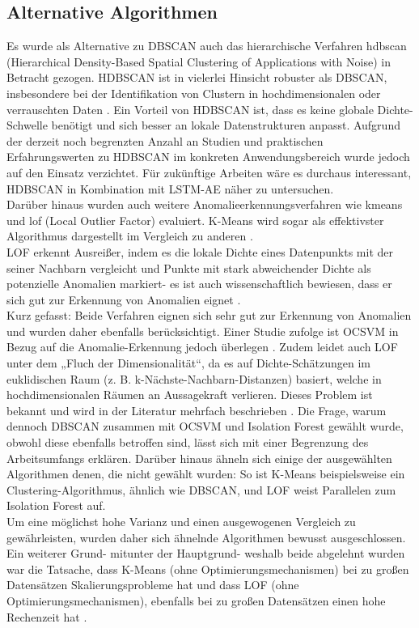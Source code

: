 \documentclass[a4paper,12pt]{article}
\begin{document}
	\subsection{Alternative Algorithmen}
	Es wurde als Alternative zu DBSCAN auch das hierarchische Verfahren \gls{hdbscan} (Hierarchical Density-Based Spatial Clustering of Applications with Noise) in Betracht gezogen. HDBSCAN ist in vielerlei Hinsicht robuster als DBSCAN,  insbesondere bei der Identifikation von Clustern in hochdimensionalen oder verrauschten Daten \cite{campello2015hierarchical}. Ein Vorteil von HDBSCAN ist, dass es keine globale Dichte-Schwelle benötigt und sich besser an lokale Datenstrukturen anpasst. Aufgrund der derzeit noch begrenzten Anzahl an Studien und praktischen Erfahrungswerten zu HDBSCAN im konkreten Anwendungsbereich wurde jedoch auf den Einsatz verzichtet. Für zukünftige Arbeiten wäre es durchaus interessant, HDBSCAN in Kombination mit LSTM-AE näher zu untersuchen.
	\\[0.5em]
	Darüber hinaus wurden auch weitere Anomalieerkennungsverfahren wie \gls{kmeans} und \gls{lof} (Local Outlier Factor) evaluiert. K-Means wird sogar als effektivster Algorithmus dargestellt im Vergleich zu anderen \cite{vinces2025comparative}.
	\\[0.5em]
	LOF erkennt Ausreißer, indem es die lokale Dichte eines Datenpunkts mit der seiner Nachbarn vergleicht und Punkte mit stark abweichender Dichte als potenzielle Anomalien markiert- es ist auch wissenschaftlich bewiesen, dass er sich gut zur Erkennung von Anomalien eignet \cite{breunig2000lof}.
	\\[0.5em]
	Kurz gefasst: Beide Verfahren eignen sich sehr gut zur Erkennung von Anomalien und wurden daher ebenfalls berücksichtigt. Einer Studie zufolge ist OCSVM in Bezug auf die Anomalie-Erkennung jedoch überlegen \cite{budiarto2025unsupervised}. Zudem leidet auch LOF unter dem „Fluch der Dimensionalität“, da es auf Dichte-Schätzungen im euklidischen Raum (z. B. k-Nächste-Nachbarn-Distanzen) basiert, welche in hochdimensionalen Räumen an Aussagekraft verlieren. Dieses Problem ist bekannt und wird in der Literatur mehrfach beschrieben \cite[S.366]{zimek2012survey}. Die Frage, warum dennoch DBSCAN zusammen mit OCSVM und Isolation Forest gewählt wurde, obwohl diese ebenfalls betroffen sind, lässt sich mit einer Begrenzung des Arbeitsumfangs erklären. Darüber hinaus ähneln sich einige der ausgewählten Algorithmen denen, die nicht gewählt wurden: So ist K-Means beispielsweise ein Clustering-Algorithmus, ähnlich wie DBSCAN, und LOF weist Parallelen zum Isolation Forest auf. 
	\\[0.5em]
	Um eine möglichst hohe Varianz und einen ausgewogenen Vergleich zu gewährleisten, wurden daher sich ähnelnde Algorithmen bewusst ausgeschlossen.
	Ein weiterer Grund- mitunter der Hauptgrund- weshalb beide abgelehnt wurden war die Tatsache, dass K-Means (ohne Optimierungsmechanismen) bei zu großen Datensätzen Skalierungsprobleme hat und dass LOF (ohne Optimierungsmechanismen), ebenfalls bei zu großen Datensätzen einen hohe Rechenzeit hat \cite{mussabayev2023kmeans,springerlof2023}.
	
\end{document}
